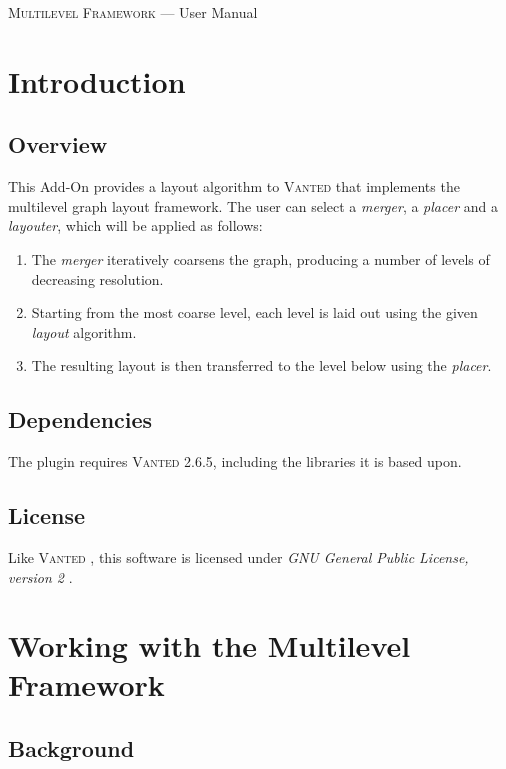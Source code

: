 \documentclass{tufte-handout}
\begin{document}
\textsc{Multilevel Framework} --- User Manual

  \setlength{\parindent}{0em}
  \setlength{\parskip}{0.75em}

  \section{Introduction}
  \subsection{Overview}
  This Add-On provides a layout algorithm to \textsc{Vanted} that implements the
  multilevel graph layout framework. The user can select a \textit{merger}, a
  \textit{placer} and a \textit{layouter}, which will be applied as follows:
  \begin{enumerate}
  \item The \textit{merger} iteratively coarsens the graph, producing a number
    of levels of decreasing resolution.
  \item Starting from the most coarse level, each level is laid out using the
    given \textit{layout} algorithm.
  \item The resulting layout is then transferred to the level below using the
    \textit{placer}.
  \end{enumerate}

  \subsection{Dependencies}
  The plugin requires \textsc{Vanted} 2.6.5, including the libraries it is based upon.

  \subsection{License}
  Like \textsc{Vanted}
  , this software is licensed under \textit{GNU General
    Public License, version 2}
  .


  \section{Working with the Multilevel Framework}

  \subsection{Background}
\end{document}
